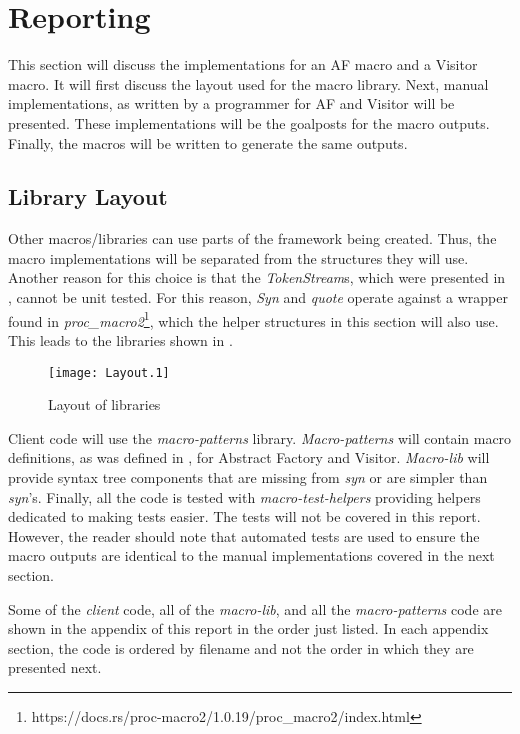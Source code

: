 \section{Reporting}
\label{sec:reporting}
This section will discuss the implementations for an AF macro and a Visitor macro.
It will first discuss the layout used for the macro library.
Next, manual implementations, as written by a programmer for AF and Visitor will be presented.
These implementations will be the goalposts for the macro outputs.
Finally, the macros will be written to generate the same outputs.

\subsection{Library Layout}
Other macros/libraries can use parts of the framework being created.
Thus, the macro implementations will be separated from the structures they will use.
Another reason for this choice is that the \textit{TokenStream}s, which were presented in , cannot be unit tested.
For this reason, \textit{Syn} and \textit{quote} operate against a wrapper found in \textit{proc\_macro2}\footnote{https://docs.rs/proc-macro2/1.0.19/proc\_macro2/index.html}, which the helper structures in this section will also use.
This leads to the libraries shown in .

\begin{figure}[h]
	\centering
	\texttt{[image: Layout.1]}
	\caption{Layout of libraries}
	\label{fig:LibraryLayout}
\end{figure}

Client code will use the \textit{macro-patterns} library.
\textit{Macro-patterns} will contain macro definitions, as was defined in , for Abstract Factory and Visitor.
\textit{Macro-lib} will provide syntax tree components that are missing from \textit{syn} or are simpler than \textit{syn}'s.
Finally, all the code is tested with \textit{macro-test-helpers} providing helpers dedicated to making tests easier.
The tests will not be covered in this report.
However, the reader should note that automated tests are used to ensure the macro outputs are identical to the manual implementations covered in the next section.

Some of the \textit{client} code, all of the \textit{macro-lib}, and all the \textit{macro-patterns} code are shown in the appendix of this report in the order just listed.
In each appendix section, the code is ordered by filename and not the order in which they are presented next.

